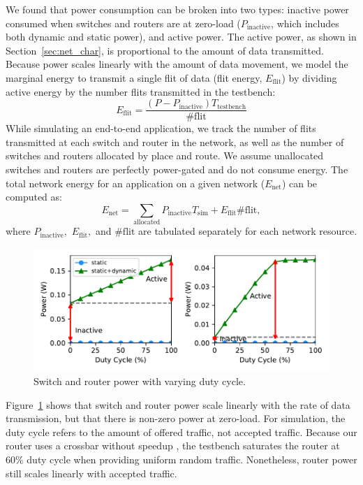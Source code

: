 We found that power consumption can be broken into two types: 
inactive power consumed when switches and routers are at zero-load ($P_{\text{inactive}}$, which includes both dynamic and static power),
and active power. The active power, as shown in Section~\ref{sec:net_char}, is proportional to the amount of
data transmitted. 
Because power scales linearly with the amount of data movement, we model the marginal energy to transmit a single flit of data (flit energy, $E_{\text{flit}}$) by dividing active energy by the number flits transmitted in the testbench:
\begin{equation}
  E_{\text{flit}} = \frac{\left(P-P_{\text{inactive}}\right) T_{\text{testbench}}}{\#\text{flit}} 
\end{equation}
While simulating an end-to-end application, we track the number of flits transmitted at each switch and router in the network, as well as the number of switches and routers allocated by place and route. 
We assume unallocated switches and routers are perfectly power-gated and do not consume energy.
The total network energy for an application on a given network ($E_{\text{net}}$) can be computed as:
\begin{equation}
  E_{\text{net}} = \sum_{\text{allocated}} P_{\text{inactive}} T_{\text{sim}}
  + E_{\text{flit}}  \#\text{flit},
\end{equation}
where $P_{\text{inactive}},$ $E_{\text{flit}},$ and $\#\text{flit}$ are tabulated separately for each network resource.

\begin{figure}
\centering
\includegraphics[width=0.8\columnwidth]{network/figs/sweep.pdf}
  \caption{Switch and router power with varying duty cycle.}\label{fig:sweep}
\end{figure}


Figure~\ref{fig:sweep} shows that switch and router power scale linearly with the rate of data transmission, but that there is non-zero power at zero-load. 
For simulation, the duty cycle refers to the amount of offered traffic, not accepted traffic.
Because our router uses a crossbar without speedup \cite{dallytowles}, the testbench saturates the router at 60\% duty cycle when providing uniform random traffic. 
Nonetheless, router power still scales linearly with accepted traffic.

